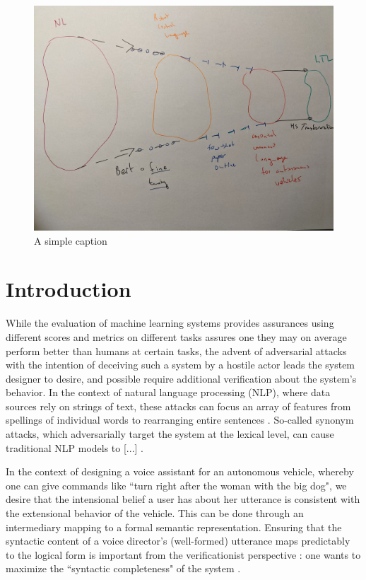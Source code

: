 \documentclass[a4paper, 11pt]{article}
\begin{document}
\begin{figure}[ht!]
\centering
\includegraphics[width=150mm]{pics/three.jpg}
\caption{A simple caption \label{overflow}}
\end{figure}

\section{Introduction}

While the evaluation of machine learning systems provides assurances using
different scores and metrics on different tasks assures one they may on average
perform better than humans at certain tasks, the advent of adversarial attacks
\cite{szegedy} with the intention of deceiving such a system by a hostile actor
leads the system designer to desire, and possible require additional
verification about the system's behavior. In the context of natural language
processing (NLP), where data sources rely on strings of text, these attacks can
focus an array of features from spellings of individual words to rearranging
entire sentences \cite{}. So-called synonym attacks, which adversarially target
the system at the lexical level, can cause traditional NLP models to [...]
\cite{}.

In the context of designing a voice assistant for an autonomous vehicle, whereby
one can give commands like ``turn right after the woman with the big dog",
we desire that the intensional belief a user has about her utterance is
consistent with the extensional behavior of the vehicle. This can be done
through an intermediary mapping to a formal semantic representation. Ensuring
that the syntactic content of a voice director's (well-formed) utterance maps predictably to
the logical form is important from the verificationist perspective : one wants
to maximize the ``syntactic completeness" of the system \cite{macmillan2021}.
\end{document}
